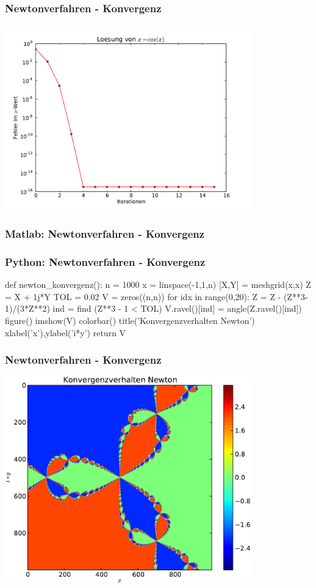 \documentclass[hyperref={xetex}]{beamer}
\begin{document}
\begin{frame}[fragile]\frametitle{Newtonverfahren - Konvergenz}
\begin{center}
 \includegraphics[width=0.8\textwidth]{figures/newton.pdf}
\end{center}
\end{frame}


\begin{frame}[fragile]\frametitle{Matlab: Newtonverfahren - Konvergenz}
\end{frame}

\begin{frame}[fragile]\frametitle{Python: Newtonverfahren - Konvergenz}
  \begin{pyin}
def newton_konvergenz():
    n = 1000
    x = linspace(-1,1,n)
    [X,Y] = meshgrid(x,x)
    Z = X + 1j*Y
    TOL = 0.02
    V = zeros((n,n))
    for idx in range(0,20):
        Z = Z - (Z**3-1)/(3*Z**2)
        ind = find (Z**3 - 1 < TOL)
        V.ravel()[ind] = angle(Z.ravel()[ind])
    figure()
    imshow(V)
    colorbar()
    title('Konvergenzverhalten Newton')
    xlabel('x'),ylabel('i*y')
    return V    
  \end{pyin}
\end{frame}

\begin{frame}[fragile]\frametitle{Newtonverfahren - Konvergenz}
\begin{center}
 \includegraphics[width=0.8\textwidth]{figures/newton_konvergenz.pdf}
\end{center}
\end{frame}
\end{document}
